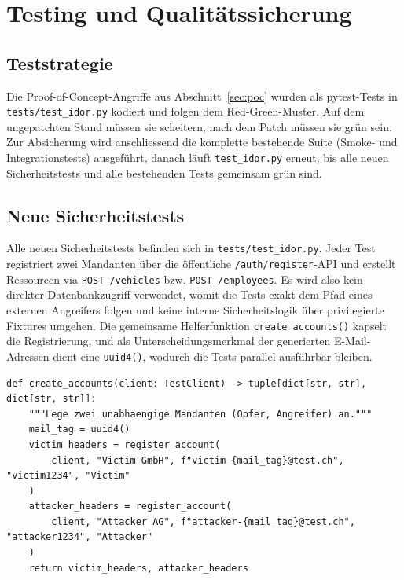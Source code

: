 \section{Testing und Qualitätssicherung}
\label{sec:testing}

\subsection{Teststrategie}
\label{sec:teststrategie}

Die Proof-of-Concept-Angriffe aus Abschnitt~\ref{sec:poc} wurden als
pytest-Tests in \texttt{tests/test\_idor.py} kodiert und folgen dem
Red-Green-Muster. Auf dem ungepatchten Stand müssen sie scheitern,
nach dem Patch müssen sie grün sein. Zur Absicherung wird anschliessend
die komplette bestehende Suite (Smoke- und Integrationstests)
ausgeführt, danach läuft \texttt{test\_idor.py} erneut, bis alle neuen
Sicherheitstests und alle bestehenden Tests gemeinsam grün sind.

\subsection{Neue Sicherheitstests}
\label{sec:neue-sicherheitstests}

Alle neuen Sicherheitstests befinden sich in \texttt{tests/test\_idor.py}.
Jeder Test registriert zwei Mandanten über die öffentliche
\texttt{/auth/register}-API und erstellt Ressourcen via
\texttt{POST /vehicles} bzw. \texttt{POST /employees}. Es wird also
kein direkter Datenbankzugriff verwendet, womit die Tests exakt dem
Pfad eines externen Angreifers folgen und keine interne Sicherheitslogik
über privilegierte Fixtures umgehen. Die gemeinsame Helferfunktion
\texttt{create\_accounts()} kapselt die Registrierung, und als
Unterscheidungsmerkmal der generierten E-Mail-Adressen dient eine
\texttt{uuid4()}, wodurch die Tests parallel ausführbar bleiben.

\begin{lstlisting}[style=custompython, caption={Helferfunktionen in \texttt{tests/test\_idor.py}.}]
def create_accounts(client: TestClient) -> tuple[dict[str, str], dict[str, str]]:
    """Lege zwei unabhaengige Mandanten (Opfer, Angreifer) an."""
    mail_tag = uuid4()
    victim_headers = register_account(
        client, "Victim GmbH", f"victim-{mail_tag}@test.ch", "victim1234", "Victim"
    )
    attacker_headers = register_account(
        client, "Attacker AG", f"attacker-{mail_tag}@test.ch", "attacker1234", "Attacker"
    )
    return victim_headers, attacker_headers
\end{lstlisting}

